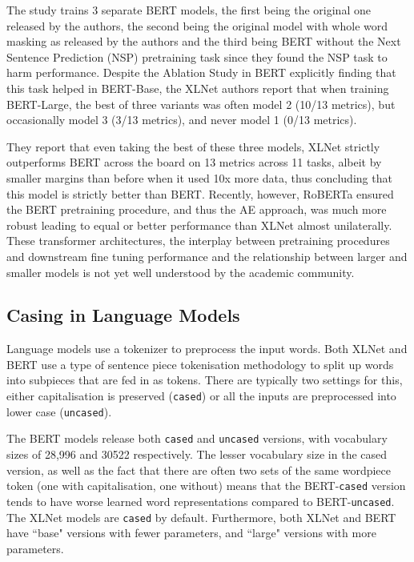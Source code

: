{{The study trains 3 separate BERT models, the first being the original one released by the authors, the second being the original model with whole word masking as released by the authors and the third being BERT without the Next Sentence Prediction (NSP) pretraining task since they found the NSP task to harm performance. Despite the Ablation Study in BERT explicitly finding that this task helped in BERT-Base, the XLNet authors report that when training BERT-Large, the best of three variants was often model 2 (10/13 metrics), but occasionally model 3 (3/13 metrics), and never model 1 (0/13 metrics).

They report that even taking the best of these three models, XLNet strictly outperforms BERT across the board on 13 metrics across 11 tasks, albeit by smaller margins than before when it used 10x more data, thus concluding that this model is strictly better than BERT. Recently, however, RoBERTa \cite{Liu2019} ensured the BERT pretraining procedure, and thus the AE approach, was much more robust leading to equal or better performance than XLNet almost unilaterally. These transformer architectures, the interplay between pretraining procedures and downstream fine tuning performance and the relationship between larger and smaller models is not yet well understood by the academic community.

\subsection{Casing in Language Models} \label{section:background:casing}
Language models use a tokenizer to preprocess the input words. Both XLNet and BERT use a type of sentence piece tokenisation methodology to split up words into subpieces that are fed in as tokens. There are typically two settings for this, either capitalisation is preserved (\texttt{cased}) or all the inputs are preprocessed into lower case (\texttt{uncased}).

The BERT models release both \texttt{cased} and \texttt{uncased} versions, with vocabulary sizes of 28,996 and 30522 respectively. The lesser vocabulary size in the cased version, as well as the fact that there are often two sets of the same wordpiece token (one with capitalisation, one without) means that the BERT-\texttt{cased} version tends to have worse learned word representations compared to BERT-\texttt{uncased}. The XLNet models are \texttt{cased} by default. Furthermore, both XLNet and BERT have ``base" versions with fewer parameters, and ``large" versions with more parameters.

}}
